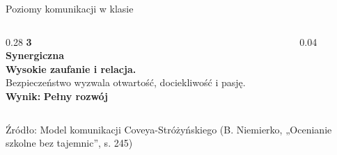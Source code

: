 \documentclass[10pt, aspectratio=169]{beamer}
\begin{document}
\begin{frame}{Poziomy komunikacji w klasie}
\begin{columns}[T]
        \begin{column}{0.28\textwidth}
            {\fontsize{55}{55}\selectfont\sffamily\bfseries\textcolor{accentTeal!15}{3}}\\[-0.8cm]
            {\large\bfseries\textcolor{accentTeal}{Synergiczna}}\\[0.3cm]
            \footnotesize\textcolor{textPrimary}{\textbf{Wysokie zaufanie i relacja.}}\\
            Bezpieczeństwo wyzwala otwartość, dociekliwość i pasję.\\[0.4cm]
            \normalsize\textbf{\textcolor{textPrimary}{Wynik:}} \textcolor{accentTeal}{\textbf{Pełny rozwój}}
        \end{column}
        
        \begin{column}{0.04\textwidth}
        \end{column}
    \end{columns}
    
    \vspace{1.2cm}
    \begin{center}
        \scriptsize\textcolor{textMuted}{Źródło: Model komunikacji Coveya-Stróżyńskiego (B. Niemierko, „Ocenianie szkolne bez tajemnic”, s. 245)}
    \end{center}
\end{frame}
\end{document}
